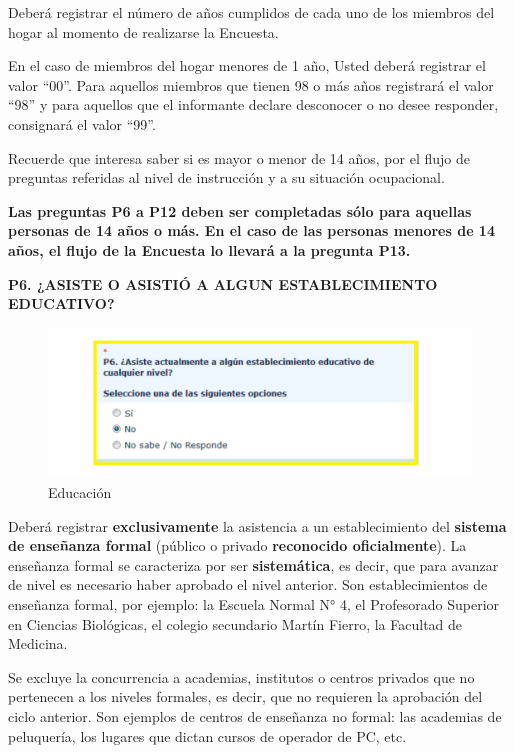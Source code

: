 \documentclass[
  openany]{book}
\begin{document}
Deberá registrar el número de años cumplidos de cada uno de los miembros del hogar al momento de realizarse la Encuesta.

En el caso de miembros del hogar menores de 1 año, Usted deberá registrar el valor ``00''. Para aquellos miembros que tienen 98 o más años registrará el valor ``98'' y para aquellos que el informante declare desconocer o no desee responder, consignará el valor ``99''.

Recuerde que interesa saber si es mayor o menor de 14 años, por el flujo de preguntas referidas al nivel de instrucción y a su situación ocupacional.

\textbf{Las preguntas P6 a P12 deben ser completadas sólo para aquellas personas de 14 años o más. En el caso de las personas menores de 14 años, el flujo de la Encuesta lo llevará a la pregunta P13.}

\textbf{P6. ¿ASISTE O ASISTIÓ A ALGUN ESTABLECIMIENTO EDUCATIVO?}

\begin{figure}

{\centering \includegraphics[width=1\linewidth]{imagenes/figura6-53} 

}

\caption{Educación}\label{fig:educacion1}
\end{figure}

Deberá registrar \textbf{exclusivamente} la asistencia a un establecimiento del \textbf{sistema de enseñanza formal} (público o privado \textbf{reconocido oficialmente}). La enseñanza formal se caracteriza por ser \textbf{sistemática}, es decir, que para avanzar de nivel es necesario haber aprobado el nivel anterior. Son establecimientos de enseñanza formal, por ejemplo: la Escuela Normal N° 4, el Profesorado Superior en Ciencias Biológicas, el colegio secundario Martín Fierro, la Facultad de Medicina.

Se excluye la concurrencia a academias, institutos o centros privados que no pertenecen a los niveles formales, es decir, que no requieren la aprobación del ciclo anterior. Son ejemplos de centros de enseñanza no formal: las academias de peluquería, los lugares que dictan cursos de operador de PC, etc.
\end{document}
